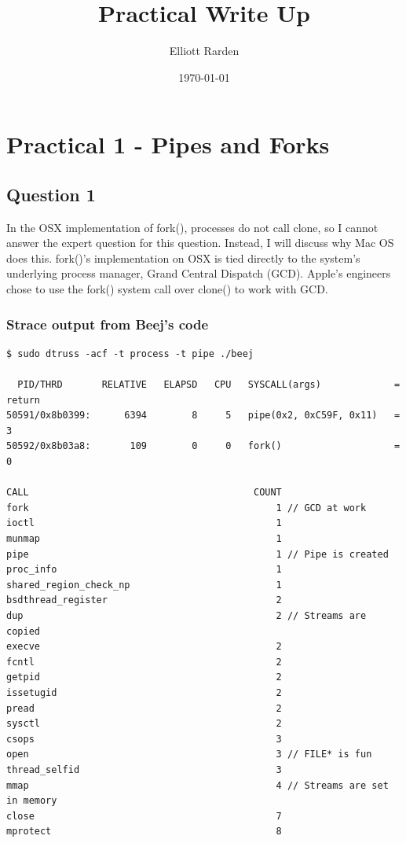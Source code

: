 \documentclass[12pt,a4paper,oneside]{article}
\title{Practical Write Up}
\author{Elliott Rarden}
\date{\today}
\begin{document}
\maketitle

\section{Practical 1 - Pipes and Forks}
\subsection{Question 1}
In the OSX implementation of fork(), processes do not call clone, so I cannot answer the expert question for this question.  Instead, I will discuss why Mac OS does this. fork()'s implementation on OSX is tied directly to the system's underlying process manager, Grand Central Dispatch (GCD).  Apple's engineers chose to use the fork() system call over clone() to work with GCD.  
\subsubsection{Strace output from Beej's code}
\begin{verbatim}
$ sudo dtruss -acf -t process -t pipe ./beej

  PID/THRD       RELATIVE   ELAPSD   CPU   SYSCALL(args)             = return
50591/0x8b0399:      6394        8     5   pipe(0x2, 0xC59F, 0x11)   = 3
50592/0x8b03a8:       109        0     0   fork()                    = 0

CALL                                        COUNT
fork                                            1 // GCD at work
ioctl                                           1
munmap                                          1
pipe                                            1 // Pipe is created
proc_info                                       1
shared_region_check_np                          1
bsdthread_register                              2
dup                                             2 // Streams are copied
execve                                          2
fcntl                                           2
getpid                                          2
issetugid                                       2
pread                                           2
sysctl                                          2
csops                                           3
open                                            3 // FILE* is fun
thread_selfid                                   3
mmap                                            4 // Streams are set in memory
close                                           7
mprotect                                        8
\end{verbatim}
\newpage
\end{document}
